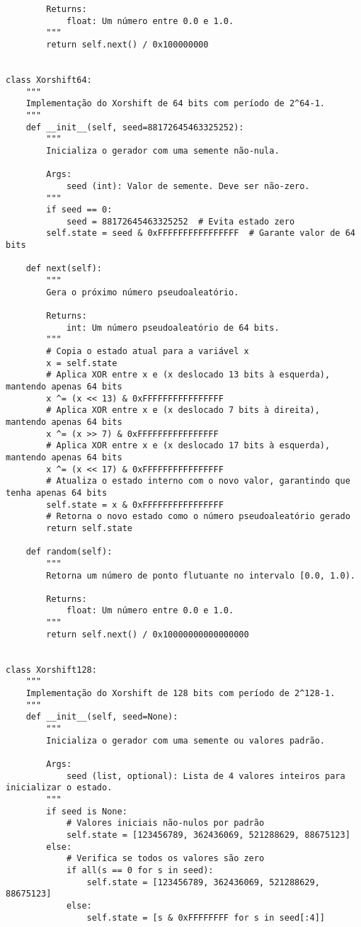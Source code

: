\begin{verbatim}
        Returns:
            float: Um número entre 0.0 e 1.0.
        """
        return self.next() / 0x100000000


class Xorshift64:
    """
    Implementação do Xorshift de 64 bits com período de 2^64-1.
    """
    def __init__(self, seed=88172645463325252):
        """
        Inicializa o gerador com uma semente não-nula.
        
        Args:
            seed (int): Valor de semente. Deve ser não-zero.
        """
        if seed == 0:
            seed = 88172645463325252  # Evita estado zero
        self.state = seed & 0xFFFFFFFFFFFFFFFF  # Garante valor de 64 bits
    
    def next(self):
        """
        Gera o próximo número pseudoaleatório.
        
        Returns:
            int: Um número pseudoaleatório de 64 bits.
        """
        # Copia o estado atual para a variável x
        x = self.state
        # Aplica XOR entre x e (x deslocado 13 bits à esquerda), mantendo apenas 64 bits
        x ^= (x << 13) & 0xFFFFFFFFFFFFFFFF
        # Aplica XOR entre x e (x deslocado 7 bits à direita), mantendo apenas 64 bits
        x ^= (x >> 7) & 0xFFFFFFFFFFFFFFFF
        # Aplica XOR entre x e (x deslocado 17 bits à esquerda), mantendo apenas 64 bits
        x ^= (x << 17) & 0xFFFFFFFFFFFFFFFF
        # Atualiza o estado interno com o novo valor, garantindo que tenha apenas 64 bits
        self.state = x & 0xFFFFFFFFFFFFFFFF
        # Retorna o novo estado como o número pseudoaleatório gerado
        return self.state
    
    def random(self):
        """
        Retorna um número de ponto flutuante no intervalo [0.0, 1.0).
        
        Returns:
            float: Um número entre 0.0 e 1.0.
        """
        return self.next() / 0x10000000000000000


class Xorshift128:
    """
    Implementação do Xorshift de 128 bits com período de 2^128-1.
    """
    def __init__(self, seed=None):
        """
        Inicializa o gerador com uma semente ou valores padrão.
        
        Args:
            seed (list, optional): Lista de 4 valores inteiros para inicializar o estado.
        """
        if seed is None:
            # Valores iniciais não-nulos por padrão
            self.state = [123456789, 362436069, 521288629, 88675123]
        else:
            # Verifica se todos os valores são zero
            if all(s == 0 for s in seed):
                self.state = [123456789, 362436069, 521288629, 88675123]
            else:
                self.state = [s & 0xFFFFFFFF for s in seed[:4]]
    

\end{verbatim}
